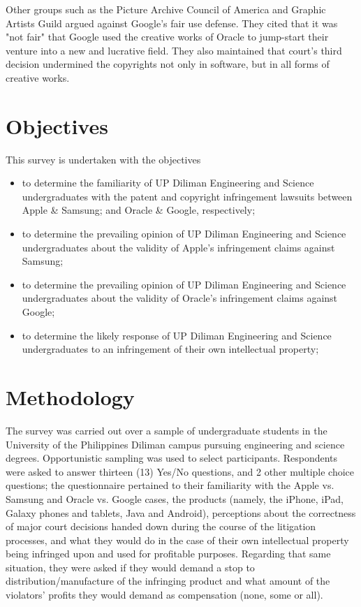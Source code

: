 \documentclass[prodmode,cs196]{acmlarge}
\begin{document}
Other groups such as the Picture Archive Council of America and Graphic Artists Guild argued against Google's fair use defense. They cited that it was "not fair" that Google used the creative works of Oracle to jump-start their venture into a new and lucrative field. They also maintained that court's third decision undermined the copyrights not only in software, but in all forms of creative works. \cite{ProOracleAmicusBrief}

\section{Objectives}

This survey is undertaken with the objectives

\begin{itemize}
	\item{to determine the familiarity of UP Diliman Engineering and Science undergraduates with the patent and copyright infringement lawsuits between Apple \& Samsung; and Oracle \& Google, respectively;}
	\item{to determine the prevailing opinion of UP Diliman Engineering and Science undergraduates about the validity of Apple's infringement claims against Samsung;}
	\item{to determine the prevailing opinion of UP Diliman Engineering and Science undergraduates about the validity of Oracle's infringement claims against Google;}
	\item{to determine the likely response of UP Diliman Engineering and Science undergraduates to an infringement of their own intellectual property;}
\end{itemize}

\section{Methodology}

The survey was carried out over a sample of undergraduate students in the University of the Philippines Diliman campus pursuing engineering and science degrees. Opportunistic sampling was used to select participants. Respondents were asked to answer thirteen (13) Yes/No questions, and 2 other multiple choice questions; the questionnaire pertained to their familiarity with the Apple vs. Samsung and Oracle vs. Google cases, the products (namely, the iPhone, iPad, Galaxy phones and tablets, Java and Android), perceptions about the correctness of major court decisions handed down during the course of the litigation processes, and what they would do in the case of their own intellectual property being infringed upon and used for profitable purposes. Regarding that same situation, they were asked if they would demand a stop to distribution/manufacture of the infringing product and what amount of the violators' profits they would demand as compensation (none, some or all).
\end{document}
